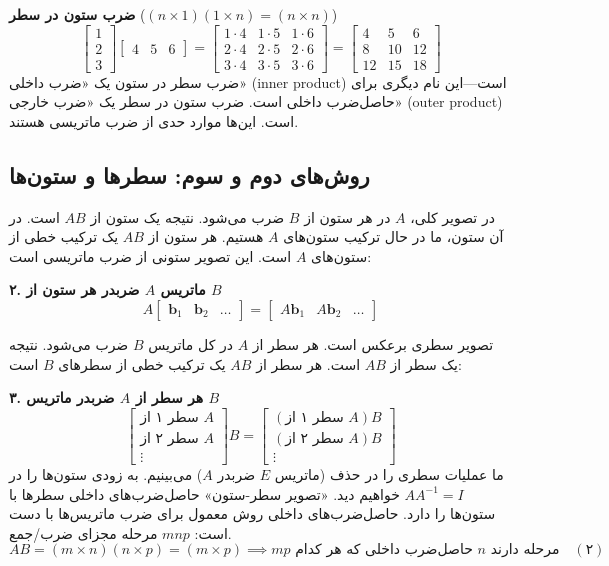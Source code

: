 \documentclass[12pt, a4paper]{book}
\begin{document}
	\textbf{ضرب ستون در سطر} ($ (n \times 1)(1 \times n) = (n \times n) $)
	\[
	\begin{bmatrix} 1 \\ 2 \\ 3 \end{bmatrix} \begin{bmatrix} 4 & 5 & 6 \end{bmatrix}
	= \begin{bmatrix}
		1 \cdot 4 & 1 \cdot 5 & 1 \cdot 6 \\
		2 \cdot 4 & 2 \cdot 5 & 2 \cdot 6 \\
		3 \cdot 4 & 3 \cdot 5 & 3 \cdot 6
	\end{bmatrix}
	= \begin{bmatrix}
		4 & 5 & 6 \\
		8 & 10 & 12 \\
		12 & 15 & 18
	\end{bmatrix}
	\]
	ضرب سطر در ستون یک «ضرب داخلی» (inner product) است—این نام دیگری برای حاصل‌ضرب داخلی است. ضرب ستون در سطر یک «ضرب خارجی» (outer product) است. این‌ها موارد حدی از ضرب ماتریسی هستند.
	
	\subsection*{روش‌های دوم و سوم: سطرها و ستون‌ها}
	در تصویر کلی، $A$ در هر ستون از $B$ ضرب می‌شود. نتیجه یک ستون از $AB$ است. در آن ستون، ما در حال ترکیب ستون‌های $A$ هستیم. هر ستون از $AB$ یک ترکیب خطی از ستون‌های $A$ است. این تصویر ستونی از ضرب ماتریسی است:
	
	\textbf{۲. ماتریس $A$ ضربدر هر ستون از $B$}
	\[ A \begin{bmatrix} \mathbf{b}_1 & \mathbf{b}_2 & \dots \end{bmatrix} = \begin{bmatrix} A\mathbf{b}_1 & A\mathbf{b}_2 & \dots \end{bmatrix} \]
	
	تصویر سطری برعکس است. هر سطر از $A$ در کل ماتریس $B$ ضرب می‌شود. نتیجه یک سطر از $AB$ است. هر سطر از $AB$ یک ترکیب خطی از سطرهای $B$ است:
	
	\textbf{۳. هر سطر از $A$ ضربدر ماتریس $B$}
	\[ \begin{bmatrix} \text{سطر ۱ از } A \\ \text{سطر ۲ از } A \\ \vdots \end{bmatrix} B = \begin{bmatrix} (\text{سطر ۱ از } A)B \\ (\text{سطر ۲ از } A)B \\ \vdots \end{bmatrix} \]
	ما عملیات سطری را در حذف (ماتریس $E$ ضربدر $A$) می‌بینیم. به زودی ستون‌ها را در $AA^{-1}=I$ خواهیم دید. «تصویر سطر-ستون» حاصل‌ضرب‌های داخلی سطرها با ستون‌ها را دارد. حاصل‌ضرب‌های داخلی روش معمول برای ضرب ماتریس‌ها با دست است: $mnp$ مرحله مجزای ضرب/جمع.
	\[ AB = (m \times n)(n \times p) = (m \times p) \implies mp \text{ حاصل‌ضرب داخلی که هر کدام } n \text{ مرحله دارند} \quad (۲) \]
	
\end{document}
